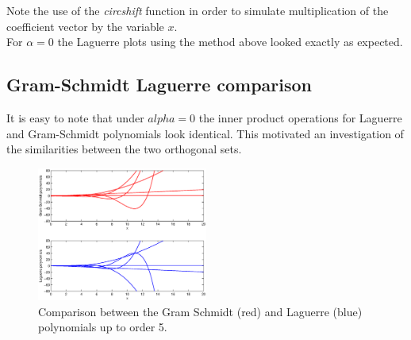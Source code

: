 \documentclass[a4paper]{article}
\numberwithin{equation}{section}
\begin{document}
\noindent Note the use of the \textit{circshift} function in order to simulate multiplication of the coefficient vector by the variable $x$.\\
For $\alpha = 0$ the Laguerre plots using the method above looked exactly as expected.

\subsection{Gram-Schmidt Laguerre comparison}

It is easy to note that under $alpha = 0$ the inner product operations for Laguerre and Gram-Schmidt polynomials look identical. This motivated an investigation of the similarities between the two orthogonal sets.

\begin{figure}[!h]
\centering
\includegraphics[width=0.5\textwidth]{gs_laguerre_comparison.eps}
\caption{\label{fig:gslaguerrecomparison}Comparison between the Gram Schmidt (red) and Laguerre (blue) polynomials up to order 5.}
\end{figure}
\end{document}
